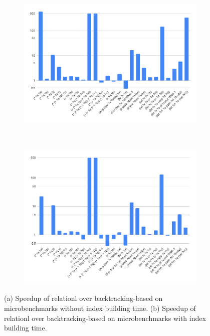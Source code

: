 \begin{figure}
\vspace{-4em}
     \centering
     \begin{subfigure}[b]{0.8\textwidth}
         \centering
         \includegraphics[width=\textwidth]{figures/bench2-1.png}
         \caption{}
         \label{bench2-1}
     \end{subfigure}
     \\
     \begin{subfigure}[b]{0.8\textwidth}
         \centering
         \includegraphics[width=\textwidth]{figures/bench2-0.png}
         \caption{}
         \label{bench2-0}
     \end{subfigure}
     \caption{(a) Speedup of relationl \ematching over backtracking-based \ematching on microbenchmarks without index building time. (b) Speedup of relationl \ematching over backtracking-based \ematching on microbenchmarks with index building time.}
     \label{bench2}
\end{figure}


